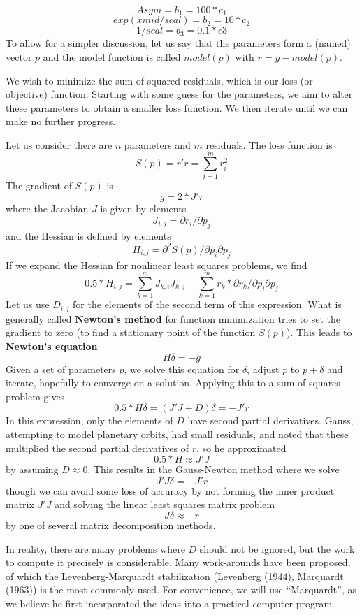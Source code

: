 \[   Asym =  b_1 = 100 * c_1 \]
\[ exp(xmid/scal)  =  b_2 = 10 * c_2 \]
\[ 1/scal  =  b_3 = 0.1*c3 \]
To allow for a simpler discussion, let us say that the parameters form a
(named) vector
\(p\) and the model function is called \(model(p)\) with \(r = y - model(p)\).

We wish to minimize the sum of squared residuals, which is our loss (or objective) function.
Starting with some guess for the parameters, we aim to alter these parameters to obtain a smaller
loss function. We then iterate until we can make no further progress.

Let us consider there are \(n\) parameters and \(m\) residuals.
The loss function is
\[ S(p) = r' r = \sum_{i=1}^m { r_i^2 }\]
The gradient of \(S(p)\) is
\[ g = 2 * J' r\]
where the Jacobian \(J\) is given by elements
\[ J_{i,j} = \partial r_i / \partial p_j \]
and the Hessian is defined by elements
\[ H_{i,j} = \partial ^2 S(p) / {\partial p_i \partial p_j} \]
If we expand the Hessian for nonlinear least squares problems, we find
\[  0.5 * H_{i,j} = \sum_{k = 1}^m{ J_{k,i} J_{k,j}}  + \sum_{k = 1}^m {r_k * \partial{r_k}/{\partial p_i \partial p_j}}\]
Let us use \(D_{i,j}\) for the elements of the second term of this expression.
What is generally called \textbf{Newton's method} for function minimization tries
to set the gradient to zero (to find a stationary point of the function \(S(p)\)).
This leads to \textbf{Newton's equation}
\[ H \delta = -g \]
Given a set of parameters \(p\), we solve this equation for \(\delta\), adjust \(p\)
to \(p + \delta\) and iterate, hopefully to converge on a solution.
Applying this to a sum of squares problem gives
\[ 0.5 * H \delta = (J'J + D) \delta = - J' r\]
In this expression, only the elements of \(D\) have second partial derivatives.
Gauss, attempting to model planetary orbits, had small residuals, and noted
that these multiplied the second partial derivatives of \(r\), so he approximated
\[ 0.5 * H \approx J' J\]
by assuming \(D \approx 0\). This results in the Gauss-Newton method where we
solve
\[ J' J \delta = - J' r\]
though we can avoid some loss of accuracy by not forming the inner product matrix
\(J' J\) and solving the linear least squares matrix problem
\[ J \delta \approx -r \]
by one of several matrix decomposition methods.

In reality, there are many problems where \(D\) should not be ignored, but the work
to compute it precisely is considerable. Many work-arounds have been
proposed, of which the Levenberg-Marquardt stabilization
(Levenberg (1944), Marquardt (1963)) is
the most commonly used. For convenience, we will use ``Marquardt'', as we believe he
first incorporated the ideas into a practical computer program.

